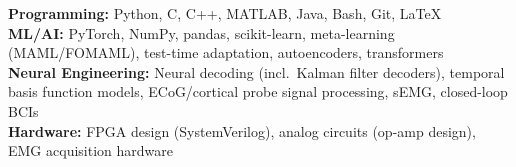 
\textbf{Programming:} Python, C, C++, MATLAB, Java, Bash, Git, \LaTeX\\
\textbf{ML/AI:} PyTorch, NumPy, pandas, scikit-learn, meta-learning (MAML/FOMAML), test-time adaptation, autoencoders, transformers\\
\textbf{Neural Engineering:} Neural decoding (incl.\ Kalman filter decoders), temporal basis function models, ECoG/cortical probe signal processing, sEMG, closed-loop BCIs\\
\textbf{Hardware:} FPGA design (SystemVerilog), analog circuits (op-amp design), EMG acquisition hardware
